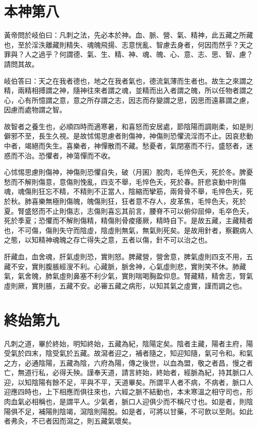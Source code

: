 \section{本神第八}

黃帝問於岐伯曰：凡刺之法，先必本於神。血、脈、營、氣、精神，此五藏之所藏也，至於淫泆離藏則精失、魂魄飛揚、志意恍亂、智慮去身者，何因而然乎？天之罪與？人之過乎？何謂德、氣、生、精、神、魂、魄、心、意、志、思、智、慮？請問其故。

岐伯答曰：天之在我者德也，地之在我者氣也，德流氣薄而生者也。故生之來謂之精，兩精相搏謂之神，隨神往來者謂之魂，並精而出入者謂之魄，所以任物者謂之心，心有所憶謂之意，意之所存謂之志，因志而存變謂之思，因思而遠慕謂之慮，因慮而處物謂之智。

故智者之養生也，必順四時而適寒暑，和喜怒而安居處，節陰陽而調剛柔，如是則僻邪不至，長生久視。是故怵惕思慮者則傷神，神傷則恐懼流淫而不止。因哀悲動中者，竭絕而失生。喜樂者，神憚散而不藏。愁憂者，氣閉塞而不行。盛怒者，迷惑而不治。恐懼者，神蕩憚而不收。

心怵惕思慮則傷神，神傷則恐懼自失，破（月囷）脫肉，毛悴色夭，死於冬。脾憂愁而不解則傷意，意傷則悗亂，四支不舉，毛悴色夭，死於春。肝悲哀動中則傷魂，魂傷則狂忘不精，不精則不正當人，陰縮而攣筋，兩脅骨不舉，毛悴色夭，死於秋。肺喜樂無極則傷魄，魄傷則狂，狂者意不存人，皮革焦，毛悴色夭，死於夏。腎盛怒而不止則傷志，志傷則喜忘其前言，腰脊不可以俯仰屈伸，毛卒色夭，死於季夏；恐懼而不解則傷精，精傷則骨痠痿厥，精時自下。是故五藏，主藏精者也，不可傷，傷則失守而陰虛，陰虛則無氣，無氣則死矣。是故用針者，察觀病人之態，以知精神魂魄之存亡得失之意，五者以傷，針不可以治之也。

肝藏血，血舍魂，肝氣虛則恐，實則怒。脾藏營，營舍意，脾氣虛則四支不用，五藏不安，實則腹脹經溲不利。心藏脈，脈舍神，心氣虛則悲，實則笑不休。肺藏氣，氣舍魄，肺氣虛則鼻塞不利少氣，實則喘喝胸盈仰息。腎藏精，精舍志，腎氣虛則厥，實則脹，五藏不安。必審五藏之病形，以知其氣之虛實，謹而調之也。




\section{終始第九}

凡刺之道，畢於終始，明知終始，五藏為紀，陰陽定矣。陰者主藏，陽者主府，陽受氣於四末，陰受氣於五藏。故瀉者迎之，補者隨之，知迎知隨，氣可令和。和氣之方，必通陰陽，五藏為陰，六府為陽，傳之後世，以血為盟，敬之者昌，慢之者亡，無道行私，必得夭殃。謹奉天道，請言終始，終始者，經脈為紀，持其脈口人迎，以知陰陽有餘不足，平與不平，天道畢矣。所謂平人者不病，不病者，脈口人迎應四時也，上下相應而俱往來也，六經之脈不結動也，本末寒溫之相守司也，形肉血氣必相稱也，是謂平人。少氣者，脈口人迎俱少而不稱尺寸也。如是者，則陰陽俱不足，補陽則陰竭，瀉陰則陽脫。如是者，可將以甘藥，不可飲以至劑。如此者弗灸，不已者因而瀉之，則五藏氣壞矣。

